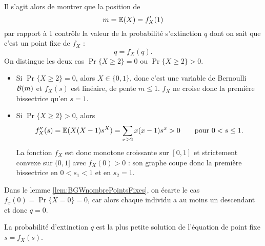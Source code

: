 \proof
Il s'agit alors de montrer que la position de
$$
m = \operatorname{\mathbb{E}}(X) = f'_X(1)
$$
par rapport à 1 contrôle la valeur de la probabilité s'extinction $q$ dont on sait que c'est un point fixe de $f_X$ : 
$$
q = f_X(q).
$$
On distingue les deux cas $\Pr\{X\geq 2\} = 0$ ou $\Pr\{X\geq 2\} > 0$.
\begin{itemize}
  \item Si $\Pr\{X\geq 2\} = 0$, alors $X \in \{0, 1\}$, donc c'est une variable de Bernoulli $\mathcal{B}(m)$ et $f_X(s)$ est linéaire, de pente $m \leq 1$. $f_X$ ne croise donc la première bissectrice qu'en $s = 1$.
  \item Si $\Pr\{X\geq 2\} > 0$, alors
  $$
  f''_X(s) = \operatorname{\mathbb{E}}(X(X-1) s^X) = \sum_{x \geq 2} x (x-1) s^x > 0
  \qquad \text{pour } 0 < s \leq 1.
  $$
  La fonction $f_X$ est donc monotone croissante sur $[0, 1]$ et strictement convexe sur $(0, 1]$ avec $f_X(0) > 0$ : son graphe coupe donc la première bissectrice en 
  $0 < s_1 < 1$ et en $s_2=1$.
\end{itemize}
\eproof

\remark
Dans le lemme \ref{lem:BGWnombrePointsFixes}, on écarte le cas $f_x(0) = \Pr\{X = 0\} = 0$, car alors chaque individu a au moins un descendant et donc $q = 0$. 

\begin{proposition}
  La probabilité d'extinction $q$ est la plus petite solution de l'équation de point fixe $s = f_X(s)$.
\end{proposition}

